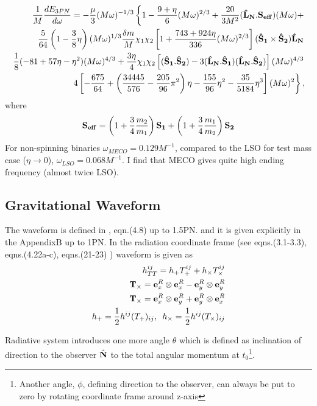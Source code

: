 \documentclass[11pt]{report}
\def\bea{\begin{eqnarray}}
\def\ena{\end{eqnarray}}
\def\bSo{{\bf \hat{S}_1}}
\def\bSt{{\bf \hat{S}_2}}
\def\bL{{\bf \hat{L}_{N}}}
\begin{document}
\bea
\frac1{M} \frac{dE_{3PN}}{d\omega} = -\frac{\mu}{3}(M\omega)^{-1/3}\left\{
1 - \frac{9+\eta}{6}(M\omega)^{2/3} + \frac{20}{3M^2}(\bL.{\bf S_{eff}})(M\omega)+
\right. \nonumber\\
\left. \frac5{64}\left( 1 - \frac3{8}\eta\right) (M\omega)^{1/3} \frac{\delta m}{M}
\chi_1\chi_2\left[ 1 + \frac{743 + 924\eta}{336}(M\omega)^{2/3}\right]
(\bSo\times\bSt)\bL \right. \nonumber \\
\left. \frac{1}{8}(-81 + 57\eta -\eta^2)(M\omega)^{4/3} + \frac{3\eta}{4}
\chi_1\chi_2 \left[ (\bSo.\bSt) - 3(\bL.\bSo)(\bL.\bSt) \right](M\omega)^{4/3}
\right. \nonumber \\
\left. 4\left[ -\frac{675}{64} + \left( \frac{34445}{576} - \frac{205}{96}\pi^2
\right)\eta -\frac{155}{96}\eta^2 - \frac{35}{5184}\eta^3 \right](M\omega)^{2}
\right\},
\ena 
where 
$$
{\bf S_{eff}} = \left( 1 + \frac3{4}\frac{m_2}{m_1} \right) {\bf S_1}+ 
\left( 1 + \frac3{4}\frac{m_1}{m_2} \right) {\bf S_2}
$$
For non-spinning binaries $\omega_{MECO} = 0.129M^{-1}$, compared to the LSO
for test mass case ($\eta \to 0$), $\omega_{LSO} = 0.068M^{-1}$. I find that 
MECO gives quite high ending frequency (almost twice LSO).


\subsection{Gravitational Waveform}

The waveform is defined in \cite{Kidder}, eqn.(4.8) up to 
1.5PN. and it is given explicitly in the AppendixB 
up to 1PN. In the radiation coordinate frame (see \cite{FC} eqns.(3.1-3.3),
\cite{Kidder} eqns.(4.22a-c), \cite{BCV2} eqns.(21-23) )
waveform is given as
\begin{eqnarray}
h_{TT}^{ij} = h_+T^{ij}_+ + h_{\times}T^{ij}_{\times}\\
{\bf T}_{\times} = {\bf e}_x^R\otimes{\bf e}_x^R - {\bf e}_y^R\otimes{\bf e}_y^R\\
{\bf T}_{\times} = {\bf e}_x^R\otimes{\bf e}_y^R + {\bf e}_y^R\otimes{\bf e}_x^R\\
h_+ = \frac1{2}h^{ij}(T_+)_{ij}, \,\,\, 
h_{\times} = \frac1{2}h^{ij}(T_{\times})_{ij}
\end{eqnarray}

Radiative system introduces one more angle $\theta$ which
is defined as inclination of direction to the observer $\hat{\bf N}$
to the total angular momentum at $t_0$\footnote{Another angle, $\phi$, defining 
direction to the observer, can always
be put to zero by rotating coordinate frame around z-axis}. 
\end{document}
